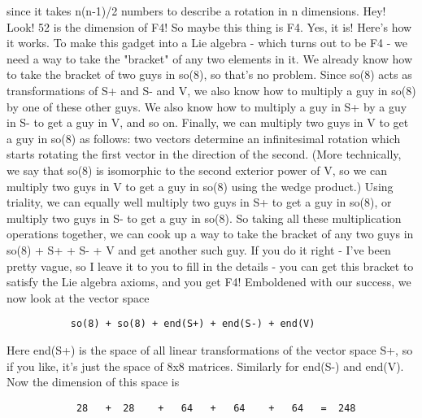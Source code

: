 since it takes n(n-1)/2 numbers to describe a rotation in n
dimensions.  Hey!  Look!  52 is the dimension of F4!  So maybe
this thing is F4.  
Yes, it is!   Here's how it works.  To make this gadget
into a Lie algebra - which turns out to be F4 - we need a way
to take the "bracket" of any two elements in it.  We already
know how to take the bracket of two guys in so(8), so that's
no problem.  Since so(8) acts as transformations of S+ and
S- and V, we also know how to multiply a guy in so(8) by
one of these other guys.  We also know how to multiply a
guy in S+ by a guy in S- to get a guy in V, and so on.  Finally,
we can multiply two guys in V to get a guy in so(8) as follows:
two vectors determine an infinitesimal rotation which starts
rotating the first vector in the direction of the second.  
(More technically, we say that so(8) is isomorphic to the 
second exterior power of V, so we can multiply two guys in
V to get a guy in so(8) using the wedge product.)  Using
triality, we can equally well multiply two guys in S+ to
get a guy in so(8), or multiply two guys in S- to get a guy
in so(8).  
So taking all these multiplication operations together, we
can cook up a way to take the bracket of any two guys in 
so(8) + S+ + S- + V and get another such guy.  If you do it
right - I've been pretty vague, so I leave it to you to fill 
in the details - you can get this bracket to satisfy the Lie 
algebra axioms, and you get F4!
Emboldened with our success, we now look at the vector space
\begin{verbatim}
           so(8) + so(8) + end(S+) + end(S-) + end(V)
\end{verbatim}
    
Here end(S+) is the space of all linear transformations of
the vector space S+, so if you like, it's just the space
of 8x8 matrices.  Similarly for end(S-) and end(V).  Now the
dimension of this space is
\begin{verbatim}
            28   +  28    +   64   +   64    +   64   =  248
\end{verbatim}
    
